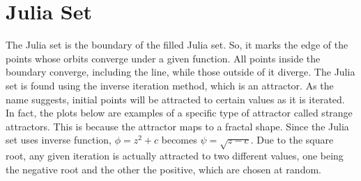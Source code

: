 \documentclass[letterpaper,11pt]{article}
\begin{document}
\section{Julia Set}
The Julia set is the boundary of the filled Julia set. So, it marks the edge of the points whose orbits converge under a given function. All points inside the boundary converge, including the line, while those outside of it diverge. The Julia set is found using the inverse iteration method, which is an attractor. As the name suggests, initial points will be attracted to certain values as it is iterated. In fact, the plots below are examples of a specific type of attractor called strange attractors. This is because the attractor maps to a fractal shape. Since the Julia set uses inverse function, $\phi = z^2 + c$ becomes  $\psi = \sqrt{z - c}$. Due to the square root, any given iteration is actually attracted to two different values, one being the negative root and the other the positive, which are chosen at random.
\end{document}
